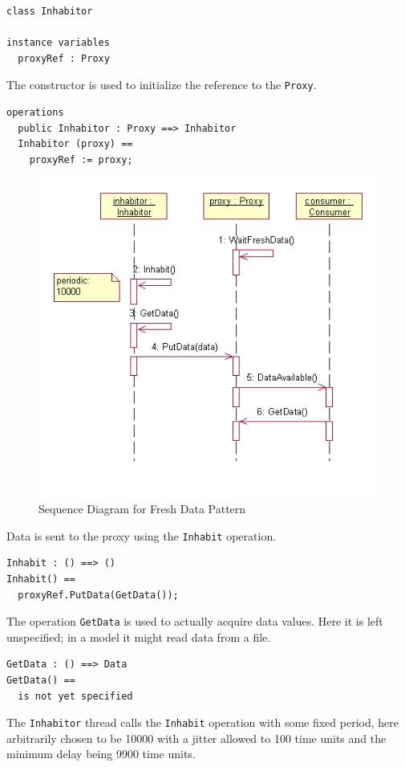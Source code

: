 \documentclass{overturerepchap}
\begin{document}
\begin{lstlisting}
class Inhabitor

instance variables
  proxyRef : Proxy
\end{lstlisting}

The constructor is used to initialize the reference to the
\texttt{Proxy}.

\begin{lstlisting}
operations
  public Inhabitor : Proxy ==> Inhabitor
  Inhabitor (proxy) ==
    proxyRef := proxy;
\end{lstlisting}

\begin{figure}
\begin{center}
\includegraphics[width=.6\textwidth]{figures/freshdataseqdiag.png}
\end{center}
\caption{Sequence Diagram for Fresh Data Pattern\label{fig:seqdiafresh} }
\end{figure}

Data is sent to the proxy using the \texttt{Inhabit} operation.

\begin{lstlisting}
Inhabit : () ==> ()
Inhabit() ==
  proxyRef.PutData(GetData());
\end{lstlisting}

The operation \texttt{GetData} is used to actually acquire data
values. Here it is left unspecified; in a model it might read data
from a file.

\begin{lstlisting}
GetData : () ==> Data
GetData() ==
  is not yet specified
\end{lstlisting}

The \texttt{Inhabitor} thread calls the \texttt{Inhabit} operation with some
fixed period, here arbitrarily chosen to be 10000 with a jitter allowed to 100
time units and the minimum delay being 9900 time units.
\end{document}
